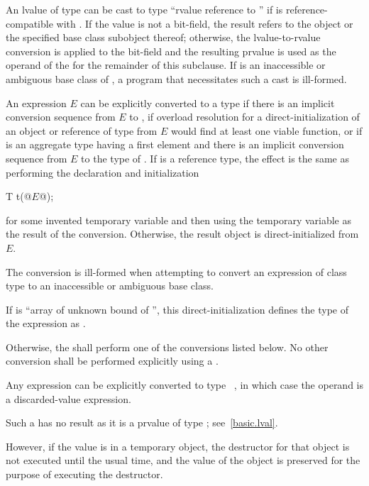 \pnum
An lvalue
of type  can be cast to type ``rvalue
reference to '' if  is reference-compatible with
. If the value is not a bit-field,
the result refers to the object or the specified base class subobject
thereof; otherwise, the lvalue-to-rvalue conversion
is applied to the bit-field and the resulting prvalue is used as the
operand of the  for the remainder of this subclause.
If  is an inaccessible or
ambiguous base class of ,
a program that necessitates such a cast is ill-formed.

\pnum
An expression $E$ can be explicitly converted to a type 
if there is an implicit conversion sequence
from $E$ to ,
if overload resolution for a direct-initialization
of an object or reference of type  from $E$
would find at least one viable function, or
if  is an aggregate type
having a first element  and
there is an implicit conversion sequence
from $E$ to the type of .
If  is a reference type, the effect is
the same as performing the declaration and initialization
\begin{codeblock}
T t(@$E$@);
\end{codeblock}
for some invented temporary variable 
and then using the temporary variable as the result of the conversion.
Otherwise, the result object is direct-initialized from $E$.
\begin{note}
The conversion is ill-formed when attempting to convert an
expression of class type to an inaccessible or ambiguous base class.
\end{note}
\begin{note}
If  is ``array of unknown bound of '',
this direct-initialization defines the type of the expression as .
\end{note}

\pnum
Otherwise, the  shall perform one of the conversions
listed below. No other conversion shall be performed explicitly using a
.

\pnum
Any expression can be explicitly converted to type \cv{}~,
in which case the operand is a discarded-value expression.
\begin{note}
Such a  has no result
as it is a prvalue of type ; see~\ref{basic.lval}.
\end{note}
\begin{note}
However, if the value is in a temporary
object, the destructor for that
object is
not executed until the usual time, and the value of the object is
preserved for the purpose of executing the destructor.
\end{note}


